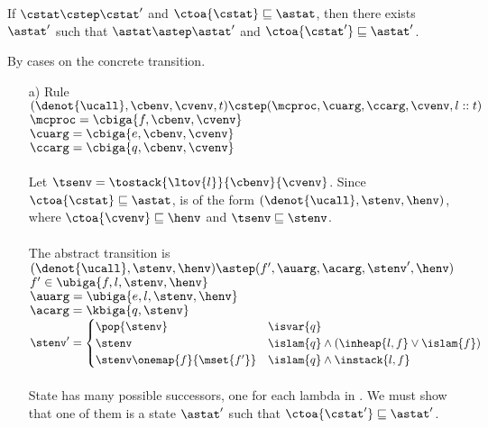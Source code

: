 \documentclass{LMCS}
\theoremstyle{definition} \newtheorem{property}[thm]{Property}
\begin{document}
\begin{thm}[Simulation]
If $\cstat \cstep \cstat'$ and $\ctoa{\cstat} \sqsubseteq \astat$, then 
there exists $\astat'$ such that $\astat \astep \astat'$
and $\ctoa{\cstat'} \sqsubseteq \astat'$.
\end{thm}
\proof
By cases on the concrete transition. 
\begin{enumerate}[$\bullet$]
  \item[a)]
    Rule  \\
    $(\denot{\ucall}, \cbenv, \cvenv, t) \cstep 
    (\mcproc, \cuarg, \ccarg, \cvenv, l::t)$ \\
    $\mcproc = \cbiga{f, \cbenv, \cvenv}$ \\
    $\cuarg = \cbiga{e, \cbenv, \cvenv}$ \\
    $\ccarg = \cbiga{q, \cbenv, \cvenv}$ \\ 
    \\
    Let $\tsenv = \tostack{\ltov{l}}{\cbenv}{\cvenv}$.
    Since $\ctoa{\cstat} \sqsubseteq \astat$, \astat{} is of the form 
    $(\denot{\ucall}, \stenv, \henv)$, where $\ctoa{\cvenv} \sqsubseteq \henv$
    and $\tsenv \sqsubseteq \stenv$. \\
    \\
    The abstract transition is \\
    $(\denot{\ucall}, \stenv, \henv) \astep 
    (f', \auarg, \acarg, \stenv', \henv)$ \\
    $f' \in \ubiga{f, l, \stenv, \henv}$ \\
    $\auarg = \ubiga{e, l, \stenv, \henv}$ \\
    $\acarg = \kbiga{q, \stenv}$ \\
    $\stenv' =
    \begin{cases}
      \pop{\stenv} & \isvar{q} \\
      \stenv & \islam{q} \land (\inheap{l, f} \lor \islam{f}) \\
      \stenv\onemap{f}{\mset{f'}} & \islam{q} \land \instack{l, f}
    \end{cases}$ \\
    \\
    State \astat{} has many possible successors, one for each lambda in 
    .
    We must show that one of them is a state $\astat'$ such that 
    $\ctoa{\cstat'} \sqsubseteq \astat'$.


\end{enumerate}
\end{document}
